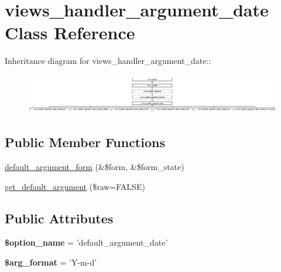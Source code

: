 \hypertarget{classviews__handler__argument__date}{
\section{views\_\-handler\_\-argument\_\-date Class Reference}
\label{classviews__handler__argument__date}
}
Inheritance diagram for views\_\-handler\_\-argument\_\-date::\begin{figure}[H]
\begin{center}
\leavevmode
\includegraphics[height=1.75549cm]{classviews__handler__argument__date}
\end{center}
\end{figure}
\subsection*{Public Member Functions}
\begin{CompactItemize}
\item 
\hyperlink{classviews__handler__argument__date_9c6775f6c034bfcec9cd0fe0ab0e96f2}{default\_\-argument\_\-form} (\&\$form, \&\$form\_\-state)
\item 
\hyperlink{classviews__handler__argument__date_1e5320e475b9e86ed9acc59c9a525610}{get\_\-default\_\-argument} (\$raw=FALSE)
\end{CompactItemize}
\subsection*{Public Attributes}
\begin{CompactItemize}
\item 
\hypertarget{classviews__handler__argument__date_fbc74be2ae0b39442c7b0e90bf444f1d}{
\textbf{\$option\_\-name} = 'default\_\-argument\_\-date'}
\label{classviews__handler__argument__date_fbc74be2ae0b39442c7b0e90bf444f1d}

\item 
\hypertarget{classviews__handler__argument__date_b397e111130ca05d397834afede8cb35}{
\textbf{\$arg\_\-format} = 'Y-m-d'}
\label{classviews__handler__argument__date_b397e111130ca05d397834afede8cb35}

\end{CompactItemize}


